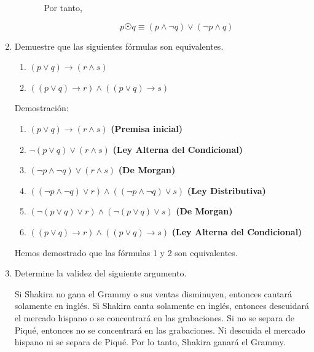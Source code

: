 \documentclass{article}
\begin{document}
\begin{enumerate}
\begin{enumerate}[label=(\alph*)]
\begin{enumerate}
    
   Por tanto, 
    
    \[ p \astrosun q \equiv (p \land \neg q) \lor (\neg p \land q) \]
    
   
    
\end{enumerate}
\end{enumerate}

  \item Demuestre que las siguientes fórmulas son equivalentes.

  \begin{enumerate}[label=\arabic*.]
    \item $(p \lor q) \rightarrow (r \land s)$
    \item $((p \lor q) \rightarrow r) \land ((p \lor q) \rightarrow s)$
  \end{enumerate}

  Demostración:

  \begin{enumerate}[label=(\alph*)]
    \item $(p \lor q) \rightarrow (r \land s)$ \quad \textbf{(Premisa inicial)}
    \item $\neg(p \lor q) \lor (r \land s)$ \quad \textbf{(Ley Alterna del Condicional)}
    \item $(\neg p \land \neg q) \lor (r \land s)$ \quad \textbf{(De Morgan)}
    \item $((\neg p \land \neg q) \lor r) \land ((\neg p \land \neg q) \lor s)$ \quad \textbf{(Ley Distributiva)}
    \item $(\neg (p \lor q) \lor r) \land (\neg (p \lor q) \lor s)$ \quad \textbf{(De Morgan)}
    \item $((p \lor q) \rightarrow r) \land ((p \lor q) \rightarrow s)$ \quad \textbf{(Ley Alterna del Condicional)}
  \end{enumerate}

  Hemos demostrado que las fórmulas 1 y 2 son equivalentes.

  \item  Determine la validez del siguiente argumento.

  Si Shakira no gana el Grammy o sus ventas disminuyen, entonces cantará solamente en inglés.
Si Shakira canta solamente en inglés, entonces descuidará el mercado hispano o se concentrará en las grabaciones. Si no se separa de Piqué, entonces no se concentrará en las grabaciones.
Ni descuida el mercado hispano ni se separa de Piqué. Por lo tanto, Shakira ganará el Grammy.


\end{enumerate}
\end{document}
